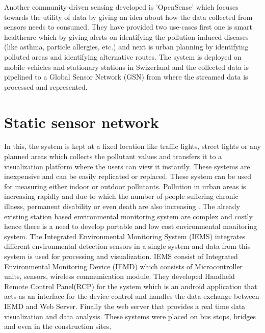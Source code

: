 Another community-driven sensing developed is 'OpenSense' \cite{Aberer2010} which focuses towards the utility of data by giving an idea about how the data collected from sensors needs to consumed. They have provided two use-cases first one is smart healthcare which by giving alerts on identifying the pollution induced diseases (like asthma, particle allergies, etc.) and next is urban planning by identifying polluted areas and identifying alternative routes. The system is deployed on mobile vehicles and stationary stations in Swizerland and the collected data is pipelined to a Global Sensor Network (GSN) from where the streamed data is processed and represented.




\section{Static sensor network}

 In this, the system is kept at a fixed location like traffic lights, street lights or any planned areas \cite{Pavani2017} which collects the pollutant values and transfers it to a visualization platform where the users can view it instantly. These systems are inexpensive and can be easily replicated or replaced. These system can be used for measuring either indoor or outdoor pollutants. Pollution in urban areas is increasing rapidly and due to which the number of people suffering chronic illness, permanent disability or even death are also increasing \cite{Wong2014}. The already existing station based environmental monitoring system are complex and costly hence there is a need to develop portable and low cost environmental monitoring system. The Integrated Environmental Monitoring System (IEMS)\cite{Wong2014} integrates different environmental detection sensors in a single  system and data from this system is used for processing and visualization. IEMS consist of Integrated Environmental Monitoring Device (IEMD) which consists of Microcontroller units, sensors, wireless communication module. They developed Handheld Remote Control Panel(RCP) for the system which is an android application that acts as an interface for the device control and handles the data exchange between IEMD and Web Server. Finally the web server that provides a real time data visualization and data analysis. These systems were placed on bus stops, bridges and even in the construction sites.

